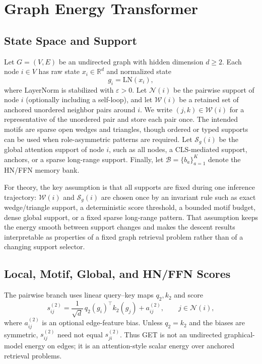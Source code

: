 \documentclass[11pt,a4paper]{article}
\begin{document}
\section{Graph Energy Transformer}

\subsection{State Space and Support}

Let $G=(V,E)$ be an undirected graph with hidden dimension $d\ge 2$. Each
node $i\in V$ has raw state $x_i\in\mathbb{R}^d$ and normalized state
\begin{equation}
  g_i = \mathrm{LN}(x_i),
  \label{eq:ln}
\end{equation}
where LayerNorm is stabilized with $\varepsilon>0$. Let $\mathcal{N}(i)$ be
the pairwise support of node $i$ (optionally including a self-loop), and let
$\mathcal{W}(i)$ be a retained set of anchored unordered neighbor pairs around
$i$. We write $(j,k)\in\mathcal W(i)$ for a representative of the unordered pair
and store each pair once. The intended motifs are sparse open wedges and
triangles, though ordered or typed supports can be used when role-asymmetric
patterns are required. Let $\mathcal S_g(i)$ be the global attention support
of node $i$, such as all nodes, a CLS-mediated support, anchors, or a sparse
long-range support. Finally, let $\mathcal{B}=\{b_a\}_{a=1}^{K}$ denote the
HN/FFN memory bank.

For theory, the key assumption is that all supports are fixed during one
inference trajectory: $\mathcal{W}(i)$ and $\mathcal S_g(i)$ are chosen once by
an invariant rule such as exact wedge/triangle support, a deterministic score
threshold, a bounded motif budget, dense global support, or a fixed sparse
long-range pattern. That assumption keeps the energy smooth between support
changes and makes the descent results interpretable as properties of a fixed
graph retrieval problem rather than of a changing support selector.

\subsection{Local, Motif, Global, and HN/FFN Scores}

The pairwise branch uses linear query--key maps $q_2,k_2$ and score
\begin{equation}
  s^{(2)}_{ij}
  = \frac{1}{\sqrt d}\,q_2(g_i)^\top k_2(g_j) + a^{(2)}_{ij},
  \qquad j\in\mathcal{N}(i),
  \label{eq:s2}
\end{equation}
where $a^{(2)}_{ij}$ is an optional edge-feature bias.
Unless $q_2=k_2$ and the biases are symmetric, $s^{(2)}_{ij}$ need not equal
$s^{(2)}_{ji}$. Thus GET is not an undirected graphical-model energy on edges;
it is an attention-style scalar energy over anchored retrieval problems.
\end{document}
